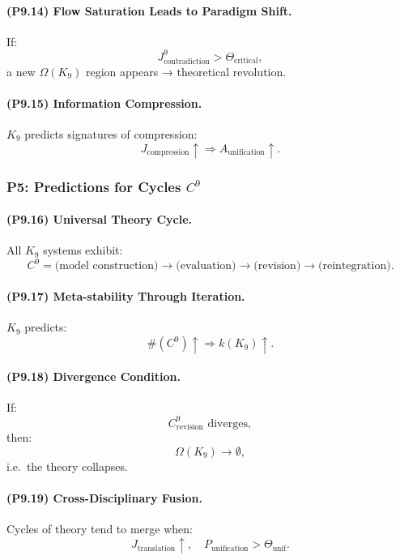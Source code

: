 \paragraph{(P9.14) Flow Saturation Leads to Paradigm Shift.}
If:
\[
J_{\mathrm{contradiction}}^9 > \Theta_{\mathrm{critical}},
\]
a new $\Omega(K_9)$ region appears → theoretical revolution.

\paragraph{(P9.15) Information Compression.}
$K_9$ predicts signatures of compression:
\[
J_{\mathrm{compression}} \uparrow 
\Rightarrow 
A_{\mathrm{unification}} \uparrow.
\]

\subsubsection{P5: Predictions for Cycles \texorpdfstring{$C^9$}{C^9}}

\paragraph{(P9.16) Universal Theory Cycle.}
All $K_9$ systems exhibit:
\[
C^9 
= 
\text{(model construction)} 
\to 
\text{(evaluation)} 
\to 
\text{(revision)} 
\to 
\text{(reintegration)}.
\]

\paragraph{(P9.17) Meta-stability Through Iteration.}
$K_9$ predicts:
\[
\#(C^9) \uparrow 
\Rightarrow 
k(K_9) \uparrow.
\]

\paragraph{(P9.18) Divergence Condition.}
If:
\[
C_{\mathrm{revision}}^9 \text{ diverges},
\]
then:
\[
\Omega(K_9) \to \emptyset,
\]
i.e.\ the theory collapses.

\paragraph{(P9.19) Cross-Disciplinary Fusion.}
Cycles of theory tend to merge when:
\[
J_{\mathrm{translation}} \uparrow,
\quad 
P_{\mathrm{unification}} > \Theta_{\mathrm{unif}}.
\]

